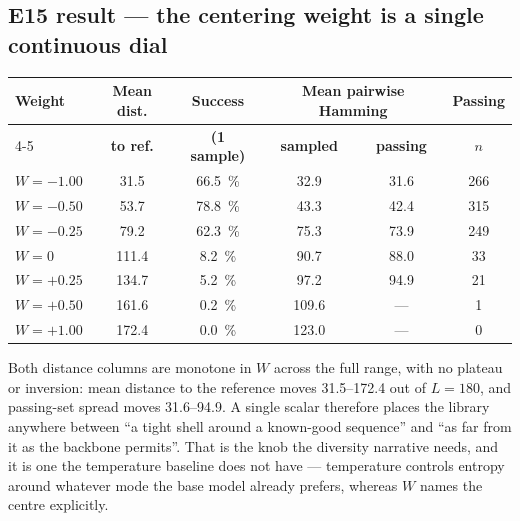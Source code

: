 \subsection*{E15 result --- the centering weight is a single continuous dial}


\begin{center}
\begin{tabular}{@{}lccccc@{}}
\toprule
\textbf{Weight} & \textbf{Mean dist.} & \textbf{Success} &
\multicolumn{2}{c}{\textbf{Mean pairwise Hamming}} & \textbf{Passing} \\
\cmidrule(lr){4-5}
                & \textbf{to ref.}    & \textbf{(1 sample)} &
\textbf{sampled} & \textbf{passing} & $n$ \\
\midrule
$W = -1.00$ & 31.5  & \SI{66.5}{\percent} & 32.9  & 31.6 & 266 \\
$W = -0.50$ & 53.7  & \SI{78.8}{\percent} & 43.3  & 42.4 & 315 \\
$W = -0.25$ & 79.2  & \SI{62.3}{\percent} & 75.3  & 73.9 & 249 \\
$W = 0$     & 111.4 & \SI{8.2}{\percent}  & 90.7  & 88.0 & 33  \\
$W = +0.25$ & 134.7 & \SI{5.2}{\percent}  & 97.2  & 94.9 & 21  \\
$W = +0.50$ & 161.6 & \SI{0.2}{\percent}  & 109.6 & ---  & 1   \\
$W = +1.00$ & 172.4 & \SI{0.0}{\percent}  & 123.0 & ---  & 0   \\
\bottomrule
\end{tabular}
\end{center}

Both distance columns are monotone in $W$ across the full range, with no
plateau or inversion: mean distance to the reference moves \numrange{31.5}{172.4}
out of $L = 180$, and passing-set spread moves \numrange{31.6}{94.9}. A single
scalar therefore places the library anywhere between ``a tight shell around a
known-good sequence'' and ``as far from it as the backbone permits''. That is
the knob the diversity narrative needs, and it is one the temperature baseline
does not have --- temperature controls entropy around whatever mode the base
model already prefers, whereas $W$ names the centre explicitly.

